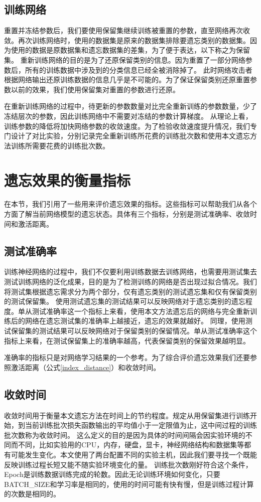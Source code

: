 \subsection{训练网络}
重置并冻结参数后，我们要使用保留集继续训练被重置的参数，直至网络再次收敛。再次训练网络时，使用的数据集是原来的数据集排除要遗忘类别的数据集。因为使用的数据是原数据集和遗忘数据集的差集，为了便于表达，以下称之为保留集。
重新训练网络的目的是为了还原保留类别的信息。因为重置了一部分网络参数后，所有的训练数据中涉及到的分类信息已经全被消除掉了。
此时网络攻击者根据网络输出还原训练数据的信息几乎是不可能的。为了保证保留类别还原重置参数以前的效果，我们使用保留集对重置的参数进行还原。

在重新训练网络的过程中，待更新的参数数量对比完全重新训练的参数数量，少了冻结层次的参数，因此训练网络中不需要对冻结的参数计算梯度。
从理论上看，训练参数的降低将加快网络参数的收敛速度。为了检验收敛速度提升情况，我们专门设计了对比实验，分别记录完全重新训练所花费的训练批次数和使用本文遗忘方法训练所需要花费的训练批次数。

\section{遗忘效果的衡量指标} \label{forget_evaluation_index}
在本节，我们引用了一些用来评价遗忘效果的指标。这些指标可以帮助我们从各个方面了解当前网络模型的遗忘状态。具体有三个指标，分别是测试准确率、收敛时间和激活距离。

\subsection{测试准确率}
训练神经网络的过程中，我们不仅要利用训练数据去训练网络，也需要用测试集去测试训练网络的泛化成果，目的是为了检测训练的网络是否出现过拟合情况。我们将测试集根据遗忘需求分为两个部分，仅有遗忘类别的测试遗忘集和仅有保留类别的测试保留集。
使用测试遗忘集的测试结果可以反映网络对于遗忘类别的遗忘程度。单从测试准确率这一个指标上来看，使用本文方法遗忘后的网络与完全重新训练后的网络在遗忘测试集的准确率上越接近，遗忘的效果就越好。
同理，使用测试保留集的测试结果可以反映网络对于保留类别的保留情况。单从测试准确率这个指标上来看，在测试保留集上的准确率越高，代表保留类别的保留效果越明显。

准确率的指标只是对网络学习结果的一个参考。为了综合评价遗忘效果我们还要参照激活距离（公式\ref{index_distance}）和收敛时间。

\subsection{收敛时间}
收敛时间用于衡量本文遗忘方法在时间上的节约程度。规定从用保留集进行训练开始，到当前训练批次损失函数输出的平均值小于一定限值为止，这中间过程的训练批次数称为收敛时间。
这么定义的目的是因为具体的时间间隔会因实验环境的不同而不同，比如实验用的CPU，内存，硬盘，显卡，神经网络结构和数据集等都有可能发生变化。本文使用了两台配置不同的实验主机，因此我们要寻找一个既能反映训练过程长短又能不随实验环境变化的量。
训练批次数刚好符合这个条件，Epoch是训练数据训练完成的轮数。因此无论训练环境如何变化，只要BATCH\_SIZE和学习率是相同的，使用的时间可能有快有慢，但是训练过程计算的次数是相同的。

